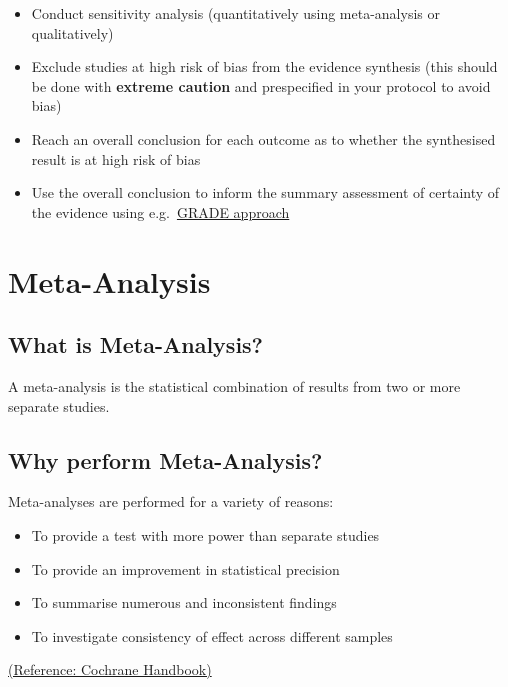 \documentclass[
]{book}
\providecommand{\tightlist}{%
  \setlength{\itemsep}{0pt}\setlength{\parskip}{0pt}}
\begin{document}
\begin{itemize}
\tightlist
\item
  Conduct sensitivity analysis (quantitatively using meta-analysis or qualitatively)
\item
  Exclude studies at high risk of bias from the evidence synthesis (this should be done with \textbf{extreme caution} and prespecified in your protocol to avoid bias)
\item
  Reach an overall conclusion for each outcome as to whether the synthesised result is at high risk of bias
\item
  Use the overall conclusion to inform the summary assessment of certainty of the evidence using e.g.~\href{https://bestpractice.bmj.com/info/toolkit/learn-ebm/what-is-grade/}{GRADE approach}
\end{itemize}

\chapter{Meta-Analysis}\label{meta-analysis}

\section{What is Meta-Analysis?}\label{what-is-meta-analysis}

A meta-analysis is the statistical combination of results from two or more separate studies.

\section{Why perform Meta-Analysis?}\label{why-perform-meta-analysis}

Meta-analyses are performed for a variety of reasons:

\begin{itemize}
\tightlist
\item
  To provide a test with more power than separate studies
\item
  To provide an improvement in statistical precision
\item
  To summarise numerous and inconsistent findings
\item
  To investigate consistency of effect across different samples
\end{itemize}

\href{https://training.cochrane.org/handbook/current}{(Reference: Cochrane Handbook)}
\end{document}
